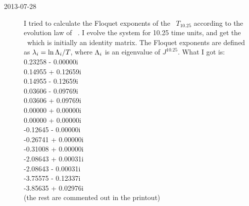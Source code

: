 \begin{description}
\item[2013-07-28  \XD] I tried to calculate the Floquet exponents of the \po\ $T_{10.25}$
according to the evolution law of \JacobianMs\ .
I evolve the system for 10.25 time units, and get the \jacobianMs\ which is initially an identity matrix.
The Floquet exponents are defined as $\lambda_i=\ln \Lambda_i /{T_{}}$, where $\Lambda_i$ is an
eigenvalue of $J^{10.25}$. What I got is:
\\

   0.23258 - 0.00000i          \\
   0.14955 + 0.12659i          \\
   0.14955 - 0.12659i          \\
   0.03606 - 0.09769i          \\
   0.03606 + 0.09769i          \\
   0.00000 + 0.00000i\\
   0.00000 + 0.00000i\\
  -0.12645 - 0.00000i          \\
  -0.26741 + 0.00000i          \\
  -0.31008 + 0.00000i          \\
  -2.08643 + 0.00031i          \\
  -2.08643 - 0.00031i          \\
  -3.75575 - 0.12337i          \\
  -3.85635 + 0.02976i          \\
         (the rest are commented out in the printout) \\


\end{description}
